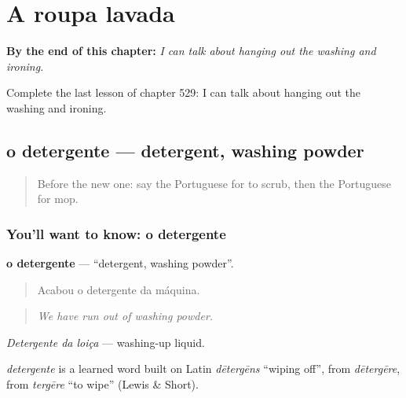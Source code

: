 
\chapter{A roupa lavada}
\label{ch:pt-a-roupa-lavada}

\begin{chapteropening}
\textbf{By the end of this chapter:} \emph{I can talk about hanging out the washing and ironing.}

Complete the last lesson of chapter 529: I can talk about hanging out the washing and ironing.
\end{chapteropening}

\section[o detergente]{o detergente — detergent, washing powder}

\label{lesson:PT-C529-detergente}



\begin{quote}
Before the new one: say the Portuguese for to scrub, then the Portuguese for mop.
\end{quote}

\subsection*{You'll want to know: o detergente}
\textbf{o detergente} — \textquotedblleft{}detergent, washing powder\textquotedblright{}.

\begin{quote}
Acabou o detergente da máquina.
\end{quote}

\begin{quote}
\emph{We have run out of washing powder.}
\end{quote}

\emph{Detergente da loiça} — washing-up liquid.

\begin{cousinweb}
\emph{detergente} is a learned word built on Latin \emph{dētergēns} \textquotedblleft{}wiping off\textquotedblright{}, from \emph{dētergēre}, from \emph{tergēre} \textquotedblleft{}to wipe\textquotedblright{} (Lewis \& Short).
\end{cousinweb}

